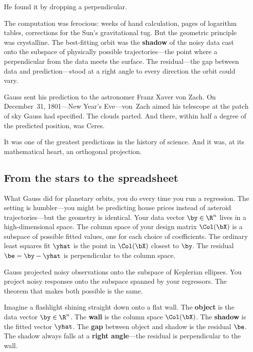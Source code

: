 He found it by dropping a perpendicular.

The computation was ferocious: weeks of hand calculation, pages of
logarithm tables, corrections for the Sun's gravitational tug.  But the
geometric principle was crystalline.  The best-fitting orbit was the
\textbf{shadow} of the noisy data cast onto the subspace of physically
possible trajectories---the point where a perpendicular from the data
meets the surface.  The residual---the gap between data and
prediction---stood at a right angle to every direction the orbit could
vary.

Gauss sent his prediction to the astronomer Franz Xaver von Zach. On
December~31, 1801---New Year's Eve---von~Zach aimed his telescope at the
patch of sky Gauss had specified. The clouds parted.  And there, within
half a degree of the predicted position, was Ceres.

It was one of the greatest predictions in the history of science. And it
was, at its mathematical heart, an orthogonal projection.

\bigskip

\subsection*{From the stars to the spreadsheet}

What Gauss did for planetary orbits, you do every time you run a
regression.  The setting is humbler---you might be predicting house
prices instead of asteroid trajectories---but the geometry is identical.
Your data vector $\by\in\R^n$ lives in a high-dimensional space.  The
column space of your design matrix $\Col(\bX)$ is a subspace of
possible fitted values, one for each choice of coefficients.  The
ordinary least squares fit $\yhat$ is the point in $\Col(\bX)$ closest
to $\by$.  The residual $\be = \by - \yhat$ is perpendicular to the
column space.

Gauss projected noisy observations onto the subspace of Keplerian
ellipses.  You project noisy responses onto the subspace spanned by
your regressors.  The theorem that makes both possible is the same.

\begin{metaphor}
Imagine a flashlight shining straight down onto a flat wall.
The \textbf{object} is the data vector $\by\in\R^n$.
The \textbf{wall} is the column space $\Col(\bX)$.
The \textbf{shadow} is the fitted vector $\yhat$.
The \textbf{gap} between object and shadow is the residual $\be$.
The shadow always falls at a \textbf{right angle}---the residual is
perpendicular to the wall.
\end{metaphor}

